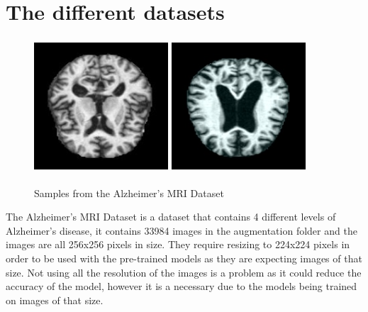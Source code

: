 \documentclass[]{final_report}
\begin{document}
\pagebreak
\section{The different datasets}

\begin{figure}[ht!]
  \centering
  \includegraphics[width=50mm,height=50mm]{images/moderateDemented.jpg}
  \includegraphics[width=50mm,height=50mm]{images/mildDemented.jpg}
  \caption{Samples from the Alzheimer's MRI Dataset\cite{AlzheimersDataset}}
\end{figure}

The Alzheimer's MRI Dataset is a dataset that contains 4 different levels of Alzheimer's disease,
it contains 33984 images in the augmentation folder and the images are all 256x256 pixels in size.
They require resizing to 224x224 pixels in order to be used with the pre-trained models as they are expecting images of that size.
Not using all the resolution of the images is a problem as it could reduce the accuracy of the model,
however it is a necessary due to the models being trained on images of that size.
\end{document}
